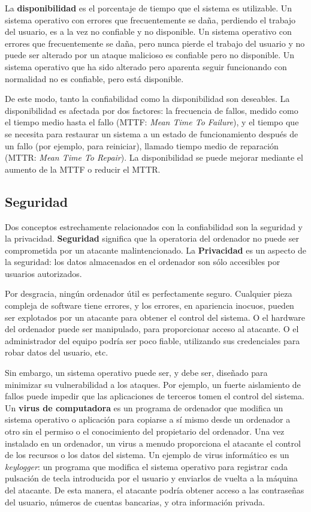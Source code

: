 \documentclass[10pt]{book}
\begin{document}
La \textbf{disponibilidad} es el porcentaje de tiempo que el sistema es utilizable. Un sistema operativo con errores que frecuentemente se daña, perdiendo el trabajo del usuario, es a la vez no confiable y no disponible. Un sistema operativo con errores que frecuentemente se daña, pero nunca pierde el trabajo del usuario y no puede ser alterado por un ataque malicioso es confiable pero no disponible. Un sistema operativo que ha sido alterado pero aparenta seguir funcionando con normalidad no es confiable, pero está disponible.

De este modo, tanto la confiabilidad como la disponibilidad son deseables. La disponibilidad es afectada por dos factores: la frecuencia de fallos, medido como el tiempo medio hasta el fallo (MTTF: \textit{Mean Time To Failure}), y el tiempo que se necesita para restaurar un sistema a un estado de funcionamiento después de un fallo (por ejemplo, para reiniciar), llamado tiempo medio de reparación (MTTR: \textit{Mean Time To Repair}). La disponibilidad se puede mejorar mediante el aumento de la MTTF o reducir el MTTR.

\subsection{Seguridad}
Dos conceptos estrechamente relacionados con la confiabilidad son la seguridad y la privacidad. \textbf{Seguridad} significa que la operatoria del ordenador no puede ser comprometida por un atacante malintencionado. La \textbf{Privacidad} es un aspecto de la seguridad: los datos almacenados en el ordenador son sólo accesibles por usuarios autorizados.

Por desgracia, ningún ordenador útil es perfectamente seguro. Cualquier pieza compleja de software tiene errores, y los errores, en apariencia inocuos, pueden ser explotados por un atacante para obtener el control del sistema. O el hardware del ordenador puede ser manipulado, para proporcionar acceso al atacante. O el administrador del equipo podría ser poco fiable, utilizando sus credenciales para robar datos del usuario, etc.

Sin embargo, un sistema operativo puede ser, y debe ser, diseñado para minimizar su vulnerabilidad a los ataques. Por ejemplo, un fuerte aislamiento de fallos puede impedir que las aplicaciones de terceros tomen el control del sistema. Un \textbf{virus de computadora} es un programa de ordenador que modifica un sistema operativo o aplicación para copiarse a sí mismo desde un ordenador a otro sin el permiso o el conocimiento del propietario del ordenador. Una vez instalado en un ordenador, un virus a menudo proporciona el atacante el control de los recursos o los datos del sistema. Un ejemplo de virus informático es un \textit{keylogger}: un programa que modifica el sistema operativo para registrar cada pulsación de tecla introducida por el usuario y enviarlos de vuelta a la máquina del atacante. De esta manera, el atacante podría obtener acceso a las contraseñas del usuario, números de cuentas bancarias, y otra información privada.
\end{document}

